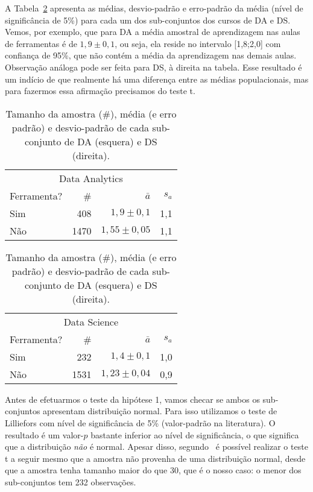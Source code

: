 A Tabela~\ref{tab:dist-hipotese-1} apresenta as médias, desvio-padrão e erro-padrão da média (nível de significância de 5\%) para cada um dos sub-conjuntos dos cursos de DA e DS.
Vemos, por exemplo, que para DA a média amostral de aprendizagem nas aulas de ferramentas é de $1,9\pm{0,1}$, ou seja, ela reside no intervalo [1,8;2,0] com confiança de 95\%, que não contém a média da aprendizagem nas demais aulas.
Observação análoga pode ser feita para DS, à direita na tabela.
Esse resultado é um indício de que realmente há uma diferença entre as médias populacionais, mas para fazermos essa afirmação precisamos do teste t.

\begin{table}
	\caption{Tamanho da amostra (\#), média (e erro padrão) e desvio-padrão de cada sub-conjunto de DA (esquera) e DS (direita).}
	\label{tab:dist-hipotese-1}
	\centering
	\begin{minipage}{0.45\textwidth}
		\begin{tabular}{lrrr}
			\toprule
			\multicolumn{4}{c}{Data Analytics}\\
			Ferramenta? & \# & $\bar{a}$ & $s_a$ \\
			\midrule
			Sim &  408 & $1,9\pm 0,1$ & 1,1 \\
			Não & 1470 & $1,55 \pm 0,05$ & 1,1 \\
			\bottomrule
		\end{tabular}
	\end{minipage}\hfill
	\begin{minipage}{0.45\textwidth}
		\begin{tabular}{lrrr}
			\toprule
			\multicolumn{4}{c}{Data Science}\\
			Ferramenta? & \# & $\bar{a}$ & $s_a$ \\
			\midrule
			Sim &  232 & $1,4\pm 0,1$ & 1,0 \\
			Não & 1531 & $1,23\pm 0,04$ & 0,9 \\
			\bottomrule
		\end{tabular}
	\end{minipage}
\end{table}

Antes de efetuarmos o teste da hipótese 1, vamos checar se ambos os sub-conjuntos apresentam distribuição normal.
Para isso utilizamos o teste de Lilliefors com nível de significância de 5\% (valor-padrão na literatura).
O resultado é um valor-$p$ bastante inferior ao nível de significância, o que significa que a distribuição \emph{não} é normal.
Apesar disso, segundo~\cite[p.~259]{Triola2005} é possível realizar o teste t a seguir mesmo que a amostra não provenha de uma distribuição normal, desde que a amostra tenha tamanho maior do que 30, que é o nosso caso: o menor dos sub-conjuntos tem 232 observações.

